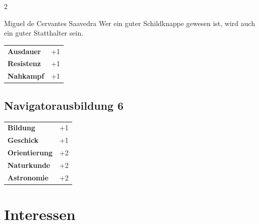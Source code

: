 \begin{multicols}{2}
\begin{tcolorbox}
\begin{pquote}{Miguel de Cervantes Saavedra}
Wer ein guter Schildknappe gewesen ist, wird auch ein guter Statthalter sein.
\end{pquote}

\vspace{3mm}

\begin{tabular}{@{}ll@{}}
    \textbf{Ausdauer} & +1\\
    \textbf{Resistenz} & +1\\
    \textbf{Nahkampf} & +1\\
\end{tabular}


\end{tcolorbox}

\begin{tcolorbox}
    \subsection*{Navigatorausbildung \hfill \small{6 }}
    \tcblower




\begin{tabular}{@{}ll@{}}
    \textbf{Bildung} & +1\\
    \textbf{Geschick} & +1\\
    \textbf{Orientierung} & +2\\
    \textbf{Naturkunde} & +2\\
    \textbf{Astronomie} & +2\\
\end{tabular}


\end{tcolorbox}

\section{Interessen}


\end{multicols}
